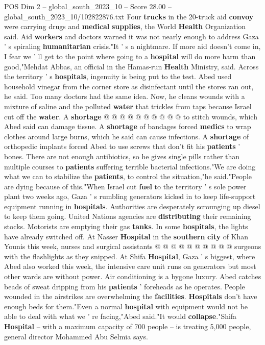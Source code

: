 \begin{textsample}{POS Dim 2 – global\_south\_2023\_10 – Score 28.00 – global\_south\_2023\_10/102822876.txt}
Four \textbf{trucks} in the 20-truck aid \textbf{convoy} were carrying drugs and \textbf{medical} \textbf{supplies}, the World \textbf{Health} Organization said.
Aid \textbf{workers} and doctors warned it was not nearly enough to address Gaza ' s spiraling \textbf{humanitarian} crisis."It ' s a nightmare.
If more aid doesn't come in, I fear we ' ll get to the point where going to a \textbf{hospital} will do more harm than good,"Mehdat Abbas, an official in the Hamas-run \textbf{Health} Ministry, said.
Across the territory ' s \textbf{hospitals}, ingenuity is being put to the test.
Abed used household vinegar from the corner store as disinfectant until the stores ran out, he said.
Too many doctors had the same idea.
Now, he cleans wounds with a mixture of saline and the polluted \textbf{water} that trickles from taps because Israel cut off the \textbf{water}.
A \textbf{shortage} @ @ @ @ @ @ @ @ @ @ to stitch wounds, which Abed said can damage tissue.
A \textbf{shortage} of bandages forced \textbf{medics} to wrap clothes around large burns, which he said can cause infections.
A \textbf{shortage} of orthopedic implants forced Abed to use screws that don't fit his \textbf{patients} ' bones.
There are not enough antibiotics, so he gives single pills rather than multiple courses to \textbf{patients} suffering terrible bacterial infections."We are doing what we can to stabilize the \textbf{patients}, to control the situation,"he said."People are dying because of this."When Israel cut \textbf{fuel} to the territory ' s sole power plant two weeks ago, Gaza ' s rumbling generators kicked in to keep life-support equipment running in \textbf{hospitals}.
Authorities are desperately scrounging up diesel to keep them going.
United Nations agencies are \textbf{distributing} their remaining stocks.
Motorists are emptying their gas \textbf{tanks}.
In some \textbf{hospitals}, the lights have already switched off.
At Nasser \textbf{Hospital} in the \textbf{southern} \textbf{city} of Khan Younis this week, nurses and surgical assistants @ @ @ @ @ @ @ @ @ @ surgeons with the flashlights as they snipped.
At Shifa \textbf{Hospital}, Gaza ' s biggest, where Abed also worked this week, the intensive care unit runs on generators but most other wards are without power.
Air conditioning is a bygone luxury.
Abed catches beads of sweat dripping from his \textbf{patients} ' foreheads as he operates.
People wounded in the airstrikes are overwhelming the \textbf{facilities}. \textbf{Hospitals} don't have enough beds for them."Even a normal \textbf{hospital} with equipment would not be able to deal with what we ' re facing,"Abed said."It would \textbf{collapse}."Shifa \textbf{Hospital} -- with a maximum capacity of 700 people -- is treating 5,000 people, general director Mohammed Abu Selmia says.

\end{textsample}
